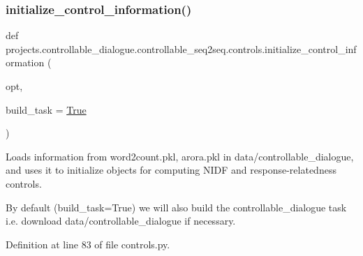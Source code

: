 \mbox{\label{namespaceprojects_1_1controllable__dialogue_1_1controllable__seq2seq_1_1controls_aafbe257df1791349439cc63c99de8b5e}} 
\subsubsection{\texorpdfstring{initialize\+\_\+control\+\_\+information()}{initialize\_control\_information()}}
{\footnotesize\ttfamily def projects.\+controllable\+\_\+dialogue.\+controllable\+\_\+seq2seq.\+controls.\+initialize\+\_\+control\+\_\+information (\begin{DoxyParamCaption}\item[{}]{opt,  }\item[{}]{build\+\_\+task = {\ttfamily \hyperlink{namespaceprojects_1_1controllable__dialogue_1_1controllable__seq2seq_1_1controls_a2f84d3a62939c36cebd6f2ebcaec08ce}{True}} }\end{DoxyParamCaption})}

\begin{DoxyVerb}Loads information from word2count.pkl, arora.pkl in data/controllable_dialogue, and
uses it to initialize objects for computing NIDF and response-relatedness controls.

By default (build_task=True) we will also build the controllable_dialogue task i.e.
download data/controllable_dialogue if necessary.
\end{DoxyVerb}
 

Definition at line 83 of file controls.\+py.


